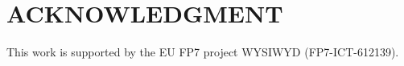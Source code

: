 \documentclass[letterpaper, 10 pt, conference]{ieeeconf}  %
\begin{document}

\section*{ACKNOWLEDGMENT}

This work is supported by the EU FP7 project WYSIWYD (FP7-ICT-612139). 





\end{document}

